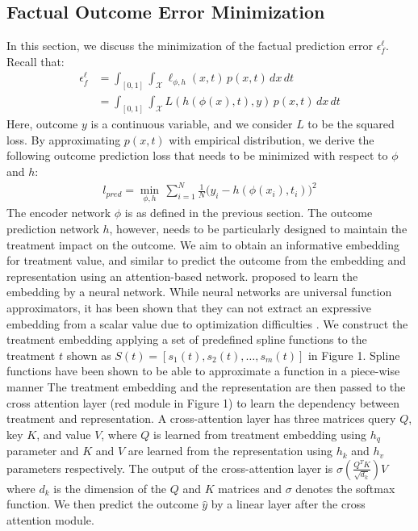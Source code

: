 \documentclass[letterpaper]{article} %
\begin{document}
\subsection{Factual Outcome Error Minimization}
In this section, we discuss the minimization of the factual prediction error $\epsilon_f^\ell$. Recall that:
\begin{align*}
    \epsilon_f^\ell &=   \int_{[0, 1]} \int_{\mathcal{X}} \ell_{\phi, h}(x, t)\, p(x, t) \, dx \, dt  \\ 
    &= \int_{[0, 1]} \int_{\mathcal{X}} L(h(\phi(x), t), y)\, p(x, t) \, dx \, dt 
\end{align*}
Here, outcome $y$ is a continuous variable, and we consider $L$ to be the squared loss. By approximating $p(x, t)$ with empirical distribution, we derive the following outcome prediction loss that needs to be minimized with respect to $\phi$ and $h$:
\begin{align*}
     l_{pred} = \min_{\phi, h} \, \sum_{i=1}^N \frac{1}{N} \big(y_i - h(\phi(x_i), t_i)\big)^2
\end{align*}
The encoder network $\phi$ is as defined in the previous section.
The outcome prediction network $h$, however, needs to be particularly designed to maintain the treatment impact on the outcome. 
We aim to obtain an informative embedding for treatment value, and similar to \cite{zhang2022exploring} predict the outcome from the embedding and representation using an attention-based network. \cite{zhang2022exploring} proposed to learn the embedding by a neural network. While neural networks are universal function approximators, it has been shown that they can not extract an expressive embedding from a scalar value due to optimization difficulties \cite{gorishniy2023embeddings}. We construct the treatment embedding applying a set of predefined spline functions to the treatment $t$ shown as $S(t) = [s_1(t), s_2(t), \dots, s_m(t)]$ in Figure 1. Spline functions have been shown to be able to approximate a function in a piece-wise manner \cite{eilers1996flexible}
\newline
\newline
The treatment embedding and the representation are then passed to the cross attention layer (red module in Figure 1) to learn the dependency between treatment and representation. A cross-attention layer has three matrices query $Q$, key $K$, and value $V$, where $Q$ is learned from treatment embedding using $h_q$ parameter and $K$ and $V$ are learned from the representation using $h_k$ and $h_v$ parameters respectively. The output of the cross-attention layer is $ \sigma(\frac{Q^TK}{\sqrt{d_k}})V$ where $d_k$ is the dimension of the $Q$ and $K$ matrices and $\sigma$ denotes the softmax function. We then predict the outcome $\hat{y}$ by a linear layer after the cross attention module. 
\end{document}
